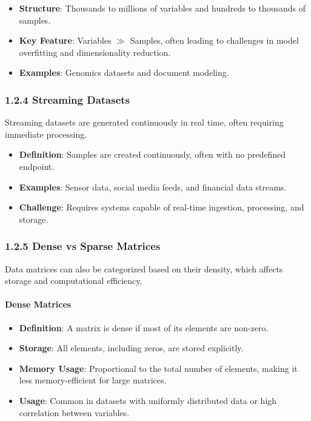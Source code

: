 \documentclass[12pt]{article}
\begin{document}
\begin{itemize}
    \item \textbf{Structure}: Thousands to millions of variables and hundreds to thousands of samples.
    \item \textbf{Key Feature}: Variables $\gg$ Samples, often leading to challenges in model overfitting and dimensionality reduction.
    \item \textbf{Examples}: Genomics datasets and document modeling.
\end{itemize}

\subsubsection{1.2.4 Streaming Datasets}
Streaming datasets are generated continuously in real time, often requiring immediate processing.

\begin{itemize}
    \item \textbf{Definition}: Samples are created continuously, often with no predefined endpoint.
    \item \textbf{Examples}: Sensor data, social media feeds, and financial data streams.
    \item \textbf{Challenge}: Requires systems capable of real-time ingestion, processing, and storage.
\end{itemize}

\subsubsection{1.2.5 Dense vs Sparse Matrices}
Data matrices can also be categorized based on their density, which affects storage and computational efficiency.

\paragraph{Dense Matrices}
\begin{itemize}
    \item \textbf{Definition}: A matrix is dense if most of its elements are non-zero.
    \item \textbf{Storage}: All elements, including zeros, are stored explicitly.
    \item \textbf{Memory Usage}: Proportional to the total number of elements, making it less memory-efficient for large matrices.
    \item \textbf{Usage}: Common in datasets with uniformly distributed data or high correlation between variables.
\end{itemize}
\end{document}
